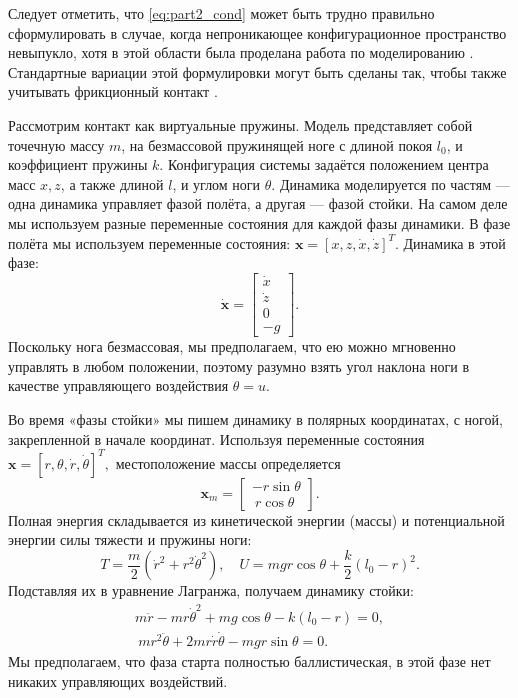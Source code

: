 Следует отметить, что \eqref{eq:part2_cond} может быть трудно правильно сформулировать в случае, когда непроникающее конфигурационное пространство невыпукло, хотя в этой области была проделана работа по моделированию \cite{Nguyen2010}. Стандартные вариации этой формулировки могут быть сделаны так, чтобы также учитывать фрикционный контакт \cite{Tassa2012, brogliato2012nonsmooth}.

Рассмотрим контакт как виртуальные пружины.
Модель представляет собой точечную массу $m$, на безмассовой пружинящей ноге с длиной покоя $l_0$, и коэффициент пружины $k$. Конфигурация системы задаётся положением центра масс $x, z$, а также длиной $l$, и углом ноги $\theta$. Динамика моделируется по частям --- одна динамика управляет фазой полёта, а другая --- фазой стойки. На самом деле мы используем разные переменные состояния для каждой фазы динамики. В фазе полёта мы используем переменные состояния: $\mathbf{x} = [x,z,\dot{x},\dot{z}]^T$. Динамика в этой фазе:
\begin{equation}
	\dot{\mathbf{x}} =
	\begin{bmatrix} \dot{x} \\ \dot{z} \\ 0 \\ - g \end{bmatrix}.
\end{equation}
Поскольку нога безмассовая, мы предполагаем, что ею можно мгновенно управлять в любом положении, поэтому разумно взять угол наклона ноги в качестве управляющего воздействия $\theta = u$.

Во время «фазы стойки» мы пишем динамику в полярных координатах, с ногой, закрепленной в начале координат. Используя переменные состояния $\mathbf{x} = [r, \theta, \dot{r}, \dot\theta]^T,$ 
местоположение массы определяется $$\mathbf{x}_m = \begin{bmatrix} - r \sin\theta \\\ r \cos\theta \end{bmatrix}. $$ Полная энергия складывается из кинетической энергии (массы) и потенциальной энергии силы тяжести и пружины ноги: $$T = \frac{m}{2} (\dot{r}^2 + r^2 \dot\theta^2 ), \quad U = mgr\cos\theta + \frac{k}{2}(l_0 - r)^2. $$ Подставляя их в уравнение Лагранжа, получаем динамику стойки: 
\begin{gather*} 
	m \ddot{r} - m r \dot\theta^2 + m g \cos\theta - k (l_0 - r) = 0, \\\ 
	m r^2 \ddot{\theta} + 2mr\dot{r}\dot\theta - mgr \sin\theta = 0.
\end{gather*} 
Мы предполагаем, что фаза старта полностью баллистическая, в этой фазе нет никаких управляющих воздействий.

